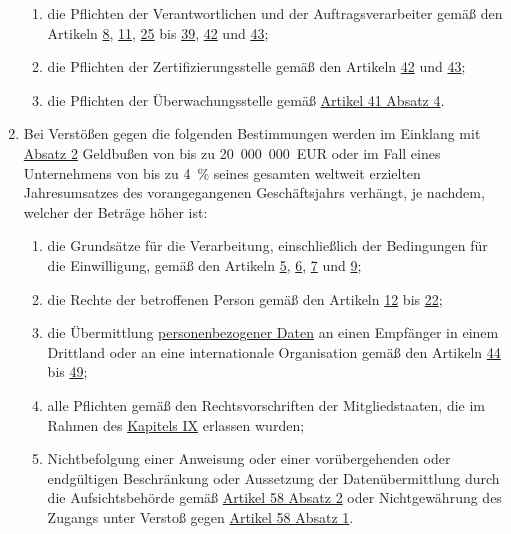 \begin{enumerate}
  \begin{enumerate}
  
    \item die Pflichten der Verantwortlichen und der Auftragsverarbeiter gemäß den Artikeln \hyperref[ch:8]{8},
     \hyperref[ch:11]{11}, \hyperref[ch:25]{25} bis \hyperref[ch:39]{39}, \hyperref[ch:42]{42} und \hyperref[ch:43]{43};
    \label{itm:83-4a}

    \item die Pflichten der Zertifizierungsstelle gemäß den Artikeln \hyperref[ch:42]{42} und \hyperref[ch:43]{43};
    \label{itm:83-4b}

    \item die Pflichten der Überwachungsstelle gemäß \hyperref[itm:41-4]{Artikel 41 Absatz 4}.
    \label{itm:83-4c}

  \end{enumerate}

  \item Bei Verstößen gegen die folgenden Bestimmungen werden im Einklang mit \hyperref[itm:83-2]{Absatz 2} Geldbußen
   von bis zu 20~000~000~EUR oder im Fall eines Unternehmens von bis zu 4~\% seines gesamten weltweit erzielten
   Jahresumsatzes des vorangegangenen Geschäftsjahrs verhängt, je nachdem, welcher der Beträge höher ist:
  \label{itm:83-5}

  \begin{enumerate}
  
    \item die Grundsätze für die Verarbeitung, einschließlich der Bedingungen für die Einwilligung, gemäß den Artikeln
     \hyperref[ch:5]{5}, \hyperref[ch:6]{6}, \hyperref[ch:7]{7} und \hyperref[ch:9]{9};
    \label{itm:83-5a}

    \item die Rechte der betroffenen Person gemäß den Artikeln \hyperref[ch:12]{12} bis \hyperref[ch:22]{22};
    \label{itm:83-5b}

    \item die Übermittlung \hyperref[itm:04-1]{personenbezogener Daten} an einen Empfänger in einem Drittland oder an eine internationale
     Organisation gemäß den Artikeln \hyperref[ch:44]{44} bis \hyperref[ch:49]{49};
    \label{itm:83-5c}

    \item alle Pflichten gemäß den Rechtsvorschriften der Mitgliedstaaten, die im Rahmen des \hyperref[part:9]
     {Kapitels IX} erlassen wurden;
    \label{itm:83-5d}

    \item Nichtbefolgung einer Anweisung oder einer vorübergehenden oder endgültigen Beschränkung oder Aussetzung der
     Datenübermittlung durch die Aufsichtsbehörde gemäß \hyperref[itm:58-2]{Artikel 58 Absatz 2} oder Nichtgewährung
     des Zugangs unter Verstoß gegen \hyperref[itm:58-1]{Artikel 58 Absatz 1}.
    \label{itm:83-5e}


\end{enumerate}
\end{enumerate}
